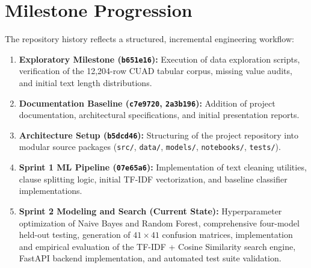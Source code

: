 \section{Milestone Progression}
\label{sec:milestone_progression}
The repository history reflects a structured, incremental engineering workflow:
\begin{enumerate}
    \item \textbf{Exploratory Milestone (\texttt{b651e16}):} Execution of data exploration scripts, verification of the 12,204-row CUAD tabular corpus, missing value audits, and initial text length distributions.
    \item \textbf{Documentation Baseline (\texttt{c7e9720}, \texttt{2a3b196}):} Addition of project documentation, architectural specifications, and initial presentation reports.
    \item \textbf{Architecture Setup (\texttt{b5dcd46}):} Structuring of the project repository into modular source packages (\texttt{src/}, \texttt{data/}, \texttt{models/}, \texttt{notebooks/}, \texttt{tests/}).
    \item \textbf{Sprint 1 ML Pipeline (\texttt{07e65a6}):} Implementation of text cleaning utilities, clause splitting logic, initial TF-IDF vectorization, and baseline classifier implementations.
    \item \textbf{Sprint 2 Modeling and Search (Current State):} Hyperparameter optimization of Naive Bayes and Random Forest, comprehensive four-model held-out testing, generation of $41 \times 41$ confusion matrices, implementation and empirical evaluation of the TF-IDF + Cosine Similarity search engine, FastAPI backend implementation, and automated test suite validation.
\end{enumerate}
